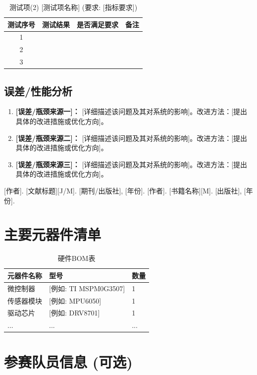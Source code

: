 \documentclass{ctexart}
\begin{document}
    \begin{table}[H]
        \centering
        \caption{测试项(2) [测试项名称] (要求: [指标要求])}
        \label{tab:task2}
        \begin{tabular}{cccc}
            \toprule
            测试序号 & 测试结果 & 是否满足要求 & 备注 \\
            \midrule
            1 & & & \\
            2 & & & \\
            3 & & & \\
            \bottomrule
        \end{tabular}
    \end{table}
    

\subsection{误差/性能分析}
    \begin{enumerate}
        \item \textbf{[误差/瓶颈来源一]：} [详细描述该问题及其对系统的影响]。改进方法：[提出具体的改进措施或优化方向]。
        \item \textbf{[误差/瓶颈来源二]：} [详细描述该问题及其对系统的影响]。改进方法：[提出具体的改进措施或优化方向]。
        \item \textbf{[误差/瓶颈来源三]：} [详细描述该问题及其对系统的影响]。改进方法：[提出具体的改进措施或优化方向]。
    \end{enumerate}

\begin{thebibliography}{99}
     [作者]. [文献标题][J/M]. [期刊/出版社], [年份].
     [作者]. [书籍名称][M]. [出版社], [年份].
\end{thebibliography}

\appendix
\section{主要元器件清单}
\begin{table}[H]
    \centering
    \caption{硬件BOM表}
    \label{tab:bom}
    \begin{tabular}{lll}
        \toprule
        元器件名称 & 型号 & 数量 \\
        \midrule
        微控制器 & [例如: TI MSPM0G3507] & 1 \\
        传感器模块 & [例如: MPU6050] & 1 \\
        驱动芯片 & [例如: DRV8701] & 1 \\
        ... & ... & ... \\ %
        \bottomrule
    \end{tabular}
\end{table}

\section{参赛队员信息 (可选)}
\end{document}
